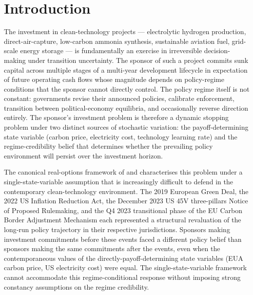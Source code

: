 \documentclass[12pt,a4paper]{article}
\theoremstyle{plain}
\theoremstyle{definition}
\begin{document}
\begin{abstract}
\medskip
\noindent\textbf{JEL classification}: D81, D92, G31, Q42, Q48, Q55

\noindent\textbf{Keywords}: real options; irreversible investment; policy uncertainty; transition risk; mechanism design; clean technology; pre-registered falsifiability; comparative statics
\end{abstract}

\section{Introduction}
\label{sec:intro}

The investment in clean-technology projects --- electrolytic hydrogen production, direct-air-capture, low-carbon ammonia synthesis, sustainable aviation fuel, grid-scale energy storage --- is fundamentally an exercise in irreversible decision-making under transition uncertainty. The sponsor of such a project commits sunk capital across multiple stages of a multi-year development lifecycle in expectation of future operating cash flows whose magnitude depends on policy-regime conditions that the sponsor cannot directly control. The policy regime itself is not constant: governments revise their announced policies, calibrate enforcement, transition between political-economy equilibria, and occasionally reverse direction entirely. The sponsor's investment problem is therefore a dynamic stopping problem under two distinct sources of stochastic variation: the payoff-determining state variable (carbon price, electricity cost, technology learning rate) and the regime-credibility belief that determines whether the prevailing policy environment will persist over the investment horizon.

The canonical real-options framework of \cite{dixit1994investment} and \cite{abel1996options} characterises this problem under a single-state-variable assumption that is increasingly difficult to defend in the contemporary clean-technology environment. The 2019 European Green Deal, the 2022 US Inflation Reduction Act, the December 2023 US 45V three-pillars Notice of Proposed Rulemaking, and the Q4 2023 transitional phase of the EU Carbon Border Adjustment Mechanism each represented a structural revaluation of the long-run policy trajectory in their respective jurisdictions. Sponsors making investment commitments before these events faced a different policy belief than sponsors making the same commitments after the events, even when the contemporaneous values of the directly-payoff-determining state variables (EUA carbon price, US electricity cost) were equal. The single-state-variable framework cannot accommodate this regime-conditional response without imposing strong constancy assumptions on the regime credibility.
\end{document}
